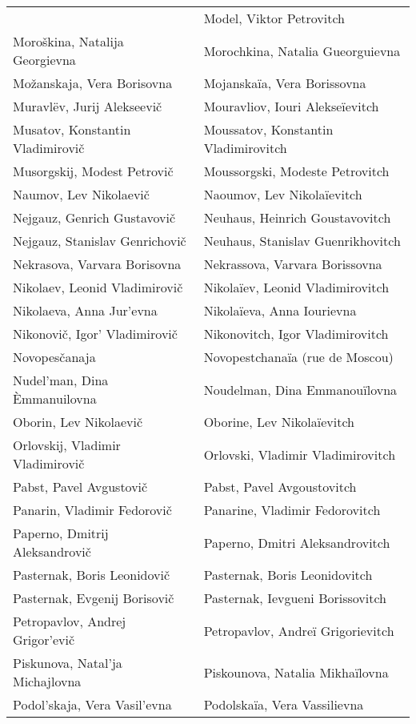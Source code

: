 {\begin{longtable}[c]{ll}
 & Model, Viktor Petrovitch
 \\
 Moroškina, Natalija Georgievna
 & Morochkina, Natalia Gueorguievna
 \\
 Možanskaja, Vera Borisovna
 & Mojanskaïa, Vera Borissovna
 \\
 Muravlëv, Jurij Alekseevič
 & Mouravliov, Iouri Alekseïevitch
 \\
 Musatov, Konstantin Vladimirovič
 & Moussatov, Konstantin Vladimirovitch
 \\
 Musorgskij, Modest Petrovič
 & Moussorgski, Modeste Petrovitch
 \\
 Naumov, Lev Nikolaevič
 & Naoumov, Lev Nikolaïevitch
 \\
 Nejgauz, Genrich Gustavovič
 & Neuhaus, Heinrich Goustavovitch
 \\
 Nejgauz, Stanislav Genrichovič
 & Neuhaus, Stanislav Guenrikhovitch
 \\
 Nekrasova, Varvara Borisovna
 & Nekrassova, Varvara Borissovna
 \\
 Nikolaev, Leonid Vladimirovič
 & Nikolaïev, Leonid Vladimirovitch
 \\
 Nikolaeva, Anna Jur'evna
 & Nikolaïeva, Anna Iourievna
 \\
 Nikonovič, Igor' Vladimirovič
 & Nikonovitch, Igor Vladimirovitch
 \\
 Novopesčanaja
 & Novopestchanaïa (rue de Moscou)
 \\
 Nudel'man, Dina Èmmanuilovna
 & Noudelman, Dina Emmanouïlovna
 \\
 Oborin, Lev Nikolaevič
 & Oborine, Lev Nikolaïevitch
 \\
 Orlovskij, Vladimir Vladimirovič
 & Orlovski, Vladimir Vladimirovitch
 \\
 Pabst, Pavel Avgustovič
 & Pabst, Pavel Avgoustovitch
 \\
 Panarin, Vladimir Fedorovič
 & Panarine, Vladimir Fedorovitch
 \\
 Paperno, Dmitrij Aleksandrovič
 & Paperno, Dmitri Aleksandrovitch
 \\
 Pasternak, Boris Leonidovič
 & Pasternak, Boris Leonidovitch
 \\
 Pasternak, Evgenij Borisovič
 & Pasternak, Ievgueni Borissovitch
 \\
 Petropavlov, Andrej Grigor'evič
 & Petropavlov, Andreï Grigorievitch
 \\
 Piskunova, Natal'ja Michajlovna
 & Piskounova, Natalia Mikhaïlovna
 \\
 Podol'skaja, Vera Vasil'evna
 & Podolskaïa, Vera Vassilievna

\end{longtable}}
